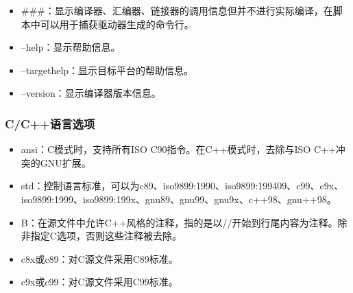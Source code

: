 \documentclass[a4paper,12pt,english]{sphinxmanual}
\begin{document}
\begin{itemize}
\item {} 
\sphinxAtStartPar
\sphinxhyphen{}\#\#\#：显示编译器、汇编器、链接器的调用信息但并不进行实际编译，在脚本中可以用于捕获驱动器生成的命令行。

\item {} 
\sphinxAtStartPar
–help：显示帮助信息。

\item {} 
\sphinxAtStartPar
–target\sphinxhyphen{}help：显示目标平台的帮助信息。

\item {} 
\sphinxAtStartPar
–version：显示编译器版本信息。

\end{itemize}


\subsubsection{C/C++语言选项}
\label{\detokenize{compiler/gnu:c-c}}\label{\detokenize{compiler/gnu:cc-2}}\begin{itemize}
\item {} 
\sphinxAtStartPar
\sphinxhyphen{}ansi：C模式时，支持所有ISO C90指令。在C++模式时，去除与ISO
C++冲突的GNU扩展。

\item {} 
\sphinxAtStartPar
\sphinxhyphen{}std：控制语言标准，可以为c89、iso9899:1990、iso9899:199409、c99、c9x、iso9899:1999、iso9899:199x、gnu89、gnu99、gnu9x、c++98、gnu++98。

\item {} 
\sphinxAtStartPar
\sphinxhyphen{}B：在源文件中允许C++风格的注释，指的是以//开始到行尾内容为注释。除非指定\sphinxhyphen{}C选项，否则这些注释被去除。

\item {} 
\sphinxAtStartPar
\sphinxhyphen{}c8x或\sphinxhyphen{}c89：对C源文件采用C89标准。

\item {} 
\sphinxAtStartPar
\sphinxhyphen{}c9x或\sphinxhyphen{}c99：对C源文件采用C99标准。

\end{itemize}
\end{document}
